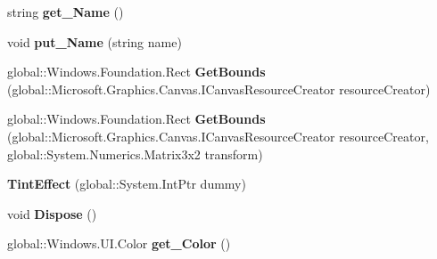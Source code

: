 \begin{DoxyCompactItemize}
\item 
\mbox{\label{class_microsoft_1_1_graphics_1_1_canvas_1_1_effects_1_1_tint_effect_aa228604fc7fc978a256564279ed52aed}} 
string {\bfseries get\+\_\+\+Name} ()
\item 
\mbox{\label{class_microsoft_1_1_graphics_1_1_canvas_1_1_effects_1_1_tint_effect_ac9913b2c3c2046f8e042f4f36c70fb5c}} 
void {\bfseries put\+\_\+\+Name} (string name)
\item 
\mbox{\label{class_microsoft_1_1_graphics_1_1_canvas_1_1_effects_1_1_tint_effect_afab469584252d81d12499e6f9b9a6e10}} 
global\+::\+Windows.\+Foundation.\+Rect {\bfseries Get\+Bounds} (global\+::\+Microsoft.\+Graphics.\+Canvas.\+I\+Canvas\+Resource\+Creator resource\+Creator)
\item 
\mbox{\label{class_microsoft_1_1_graphics_1_1_canvas_1_1_effects_1_1_tint_effect_a874cd7c0fda492b02303c38329523bb5}} 
global\+::\+Windows.\+Foundation.\+Rect {\bfseries Get\+Bounds} (global\+::\+Microsoft.\+Graphics.\+Canvas.\+I\+Canvas\+Resource\+Creator resource\+Creator, global\+::\+System.\+Numerics.\+Matrix3x2 transform)
\item 
\mbox{\label{class_microsoft_1_1_graphics_1_1_canvas_1_1_effects_1_1_tint_effect_ab6a7900d7383e34db9dae72dfca0b03c}} 
{\bfseries Tint\+Effect} (global\+::\+System.\+Int\+Ptr dummy)
\item 
\mbox{\label{class_microsoft_1_1_graphics_1_1_canvas_1_1_effects_1_1_tint_effect_ab057d395ffb4168e2e95ebdec2027f4f}} 
void {\bfseries Dispose} ()
\item 
\mbox{\label{class_microsoft_1_1_graphics_1_1_canvas_1_1_effects_1_1_tint_effect_a0286d78ccbae82990f13233219282806}} 
global\+::\+Windows.\+U\+I.\+Color {\bfseries get\+\_\+\+Color} ()
\item 

\end{DoxyCompactItemize}
